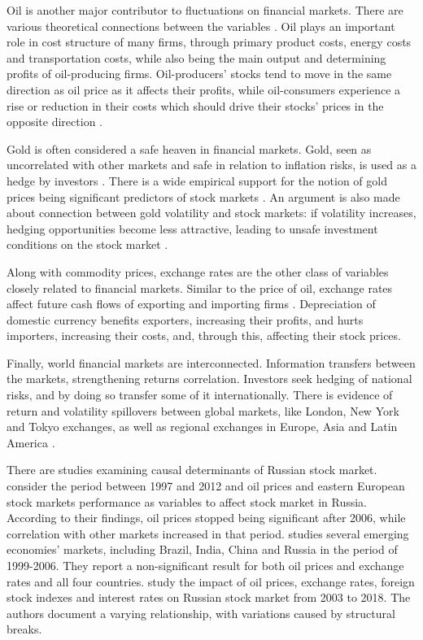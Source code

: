 \documentclass[review, authoryear]{elsarticle}
\begin{document}
Oil is another major contributor to fluctuations on financial markets.
There are various theoretical connections between the variables \citep{degiannakis_oil_2018, nandha_does_2008}.
Oil plays an important role in cost structure of many firms, through primary product costs, energy costs and transportation costs, while also being the main output and determining profits of oil-producing firms.
Oil-producers' stocks tend to move in the same direction as oil price as it affects their profits, while oil-consumers experience a rise or reduction in their costs which should drive their stocks' prices in the opposite direction \citep{basher_oil_2006, filis_dynamic_2011}.

Gold is often considered a safe heaven in financial markets. Gold, seen as uncorrelated with other markets and safe in relation to inflation risks, is used as a hedge by investors \citep{baur_is_2010}. There is a wide empirical support for the notion of gold prices being significant predictors of stock markets \citep{choudhry_relationship_2015, arfaoui_oil_2017, al-ameer_relationship_2018}. An argument is also made about connection between gold volatility and stock markets: if volatility increases, hedging opportunities become less attractive, leading to unsafe investment conditions on the stock market \citep{baur_asymmetric_2012, gokmenoglu_interactions_2015, contuk_effect_2013}.

Along with commodity prices, exchange rates are the other class of variables closely related to financial markets.
Similar to the price of oil, exchange rates affect future cash flows of exporting and importing firms \citep{dornbusch_exchange_1980}. Depreciation of domestic currency benefits exporters, increasing their profits, and hurts importers, increasing their costs, and, through this, affecting their stock prices. 

Finally, world financial markets are interconnected. Information transfers between the markets, strengthening returns correlation. Investors seek hedging of national risks, and by doing so transfer some of it internationally. There is evidence of return and volatility spillovers between global markets, like London, New York and Tokyo exchanges, as well as regional exchanges in Europe, Asia and Latin America \citep{beirne_global_2010, kim_international_1995}.

There are studies examining causal determinants of Russian stock market. \cite{korhonen_what_2016} consider the period between 1997 and 2012 and oil prices and eastern European stock markets performance as variables to affect stock market in Russia. According to their findings, oil prices stopped being significant after 2006, while correlation with other markets increased in that period. \cite{robert_d_gay_effect_2008} studies several emerging economies' markets, including Brazil, India, China and Russia in the period of 1999-2006. They report a non-significant result for both oil prices and exchange rates and all four countries. \cite{lozinskaia_fundamental_2019} study the impact of oil prices, exchange rates, foreign stock indexes and interest rates on Russian stock market from 2003 to 2018. The authors document a varying relationship, with variations caused by structural breaks.
\end{document}
